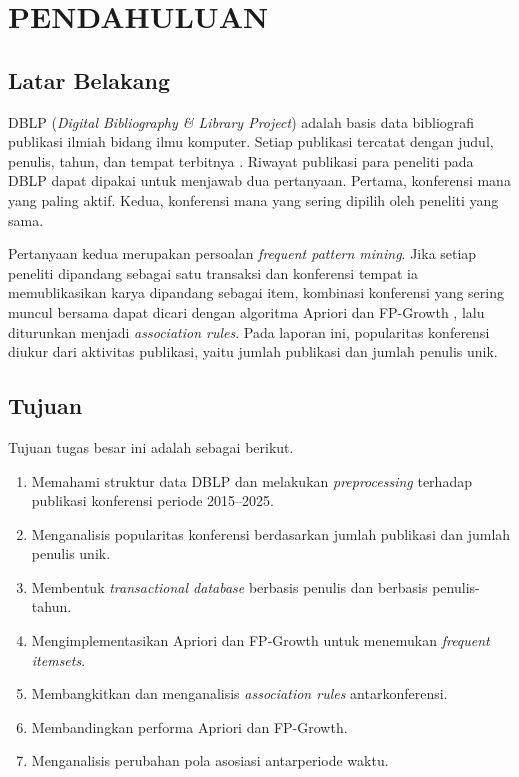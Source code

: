 \chapter{PENDAHULUAN}
\label{chap:pendahuluan}

\section{Latar Belakang}
DBLP (\textit{Digital Bibliography \& Library Project}) adalah basis data bibliografi publikasi ilmiah bidang ilmu komputer. Setiap publikasi tercatat dengan judul, penulis, tahun, dan tempat terbitnya \cite{ley2009}. Riwayat publikasi para peneliti pada DBLP dapat dipakai untuk menjawab dua pertanyaan. Pertama, konferensi mana yang paling aktif. Kedua, konferensi mana yang sering dipilih oleh peneliti yang sama.

Pertanyaan kedua merupakan persoalan \textit{frequent pattern mining}. Jika setiap peneliti dipandang sebagai satu transaksi dan konferensi tempat ia memublikasikan karya dipandang sebagai item, kombinasi konferensi yang sering muncul bersama dapat dicari dengan algoritma Apriori \cite{agrawal1994} dan FP-Growth \cite{han2000}, lalu diturunkan menjadi \textit{association rules}. Pada laporan ini, popularitas konferensi diukur dari aktivitas publikasi, yaitu jumlah publikasi dan jumlah penulis unik.

\section{Tujuan}
Tujuan tugas besar ini adalah sebagai berikut.
\begin{enumerate}
\item Memahami struktur data DBLP dan melakukan \textit{preprocessing} terhadap publikasi konferensi periode 2015--2025.
\item Menganalisis popularitas konferensi berdasarkan jumlah publikasi dan jumlah penulis unik.
\item Membentuk \textit{transactional database} berbasis penulis dan berbasis penulis-tahun.
\item Mengimplementasikan Apriori dan FP-Growth untuk menemukan \textit{frequent itemsets}.
\item Membangkitkan dan menganalisis \textit{association rules} antarkonferensi.
\item Membandingkan performa Apriori dan FP-Growth.
\item Menganalisis perubahan pola asosiasi antarperiode waktu.
\end{enumerate}

